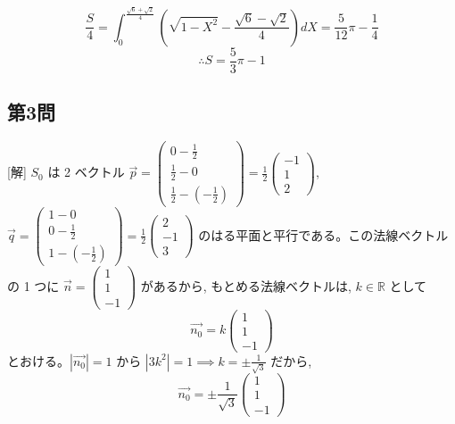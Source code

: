 \documentclass[../main.tex]{subfiles}
\begin{document}
\noindent
[解2]
\[
  \frac{S}{4} = \int_{0}^{\frac{\sqrt{6}+\sqrt{2}}{4}} \left( \sqrt{1 - X^2} - \frac{\sqrt{6}-\sqrt{2}}{4} \right) dX = \frac{5}{12}\pi - \frac{1}{4}
\]
\[
  \therefore S = \frac{5}{3}\pi - 1
\]

\subsection*{第3問}

[解] $S_0$ は 2 ベクトル $\vec{p} =
\begin{pmatrix} 0 - \frac{1}{2} \\ \frac{1}{2} - 0 \\ \frac{1}{2} - \left(-\frac{1}{2}\right)
\end{pmatrix} = \frac{1}{2}
\begin{pmatrix} -1 \\ 1 \\ 2
\end{pmatrix}$, $\vec{q} =
\begin{pmatrix} 1 - 0 \\ 0 - \frac{1}{2} \\ 1 - \left(-\frac{1}{2}\right)
\end{pmatrix} = \frac{1}{2}
\begin{pmatrix} 2 \\ -1 \\ 3
\end{pmatrix}$ のはる平面と平行である。この法線ベクトルの 1 つに $\vec{n} =
\begin{pmatrix} 1 \\ 1 \\ -1
\end{pmatrix}$ があるから, もとめる法線ベクトルは, $k \in \mathbb{R}$ として
\[
  \vec{n_0} = k
  \begin{pmatrix} 1 \\ 1 \\ -1
  \end{pmatrix}
\]
とおける。$|\vec{n_0}| = 1$ から $|3k^2| = 1 \implies k = \pm \frac{1}{\sqrt{3}}$ だから,
\[
  \vec{n_0} = \pm \frac{1}{\sqrt{3}}
  \begin{pmatrix} 1 \\ 1 \\ -1
  \end{pmatrix}
\]
\end{document}
